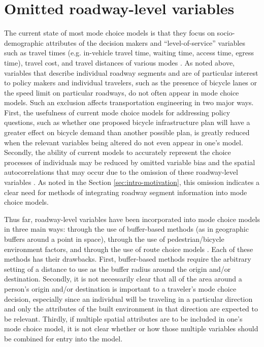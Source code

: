 \documentclass{article}
\begin{document}
\section{Omitted roadway-level variables}
\label{sec:omitted_vars}
The current state of most mode choice models is that they focus on socio-demographic attributes of the decision makers and ``level-of-service'' variables such as travel times (e.g. in-vehicle travel time, waiting time, access time, egress time), travel cost, and travel distances of various modes \citep{singleton_pedestrians_2013}. As noted above, variables that describe individual roadway segments and are of particular interest to policy makers and individual travelers, such as the presence of bicycle lanes or the speed limit on particular roadways, do not often appear in mode choice models. Such an exclusion affects transportation engineering in two major ways. First, the usefulness of current mode choice models for addressing policy questions, such as whether one proposed bicycle infrastructure plan will have a greater effect on bicycle demand than another possible plan, is greatly reduced when the relevant variables being altered do not even appear in one's model. Secondly, the ability of current models to accurately represent the choice processes of individuals may be reduced by omitted variable bias and the spatial autocorrelations that may occur due to the omission of these roadway-level variables \citep{goetzke_are_2003}. As noted in the Section \ref{sec:intro-motivation}, this omission indicates a clear need for methods of integrating roadway segment information into mode choice models.

Thus far, roadway-level variables have been incorporated into mode choice models in three main ways: through the use of buffer-based methods (as in geographic buffers around a point in space), through the use of pedestrian/bicycle environment factors, and through the use of route choice models \citep{guo_effect_2007, replogle_integrating_1995, nassir_choice_2014}. Each of these methods has their drawbacks. First, buffer-based methods require the arbitrary setting of a distance to use as the buffer radius around the origin and/or destination. Secondly, it is not necessarily clear that all of the area around a person's origin and/or destination is important to a traveler's mode choice decision, especially since an individual will be traveling in a particular direction and only the attributes of the built environment in that direction are expected to be relevant. Thirdly, if multiple spatial attributes are to be included in one's mode choice model, it is not clear whether or how those multiple variables should be combined for entry into the model. 
\end{document}
